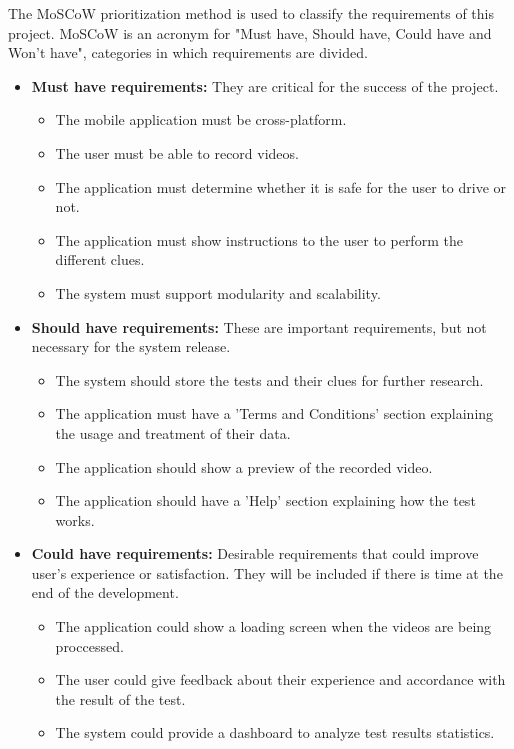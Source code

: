The MoSCoW prioritization method \cite{moscow} is used to classify the requirements of this project. MoSCoW is an acronym for "Must have, Should have, Could have and Won’t have", categories in which requirements are divided.

\begin{itemize}
  \item \textbf{Must have requirements:} They are critical for the success of the project.
    \begin{itemize}
      \item The mobile application must be cross-platform.
      \item The user must be able to record videos.
      \item The application must determine whether it is safe for the user to drive or not.
      \item The application must show instructions to the user to perform the different clues.
      \item The system must support modularity and scalability.
    \end{itemize}
  \item \textbf{Should have requirements:} These are important requirements, but not necessary for the system release.
    \begin{itemize}
      \item The system should store the tests and their clues for further research.
      \item The application must have a 'Terms and Conditions' section explaining the usage and treatment of their data.
      \item The application should show a preview of the recorded video.
      \item The application should have a 'Help' section explaining how the test works.
    \end{itemize}
  \item \textbf{Could have requirements:} Desirable requirements that could improve user’s experience or satisfaction. They will be included if there is time at the end of the development.
    \begin{itemize}
      \item The application could show a loading screen when the videos are being proccessed.
      \item The user could give feedback about their experience and accordance with the result of the test.
      \item The system could provide a dashboard to analyze test results statistics.

\end{itemize}
\end{itemize}
